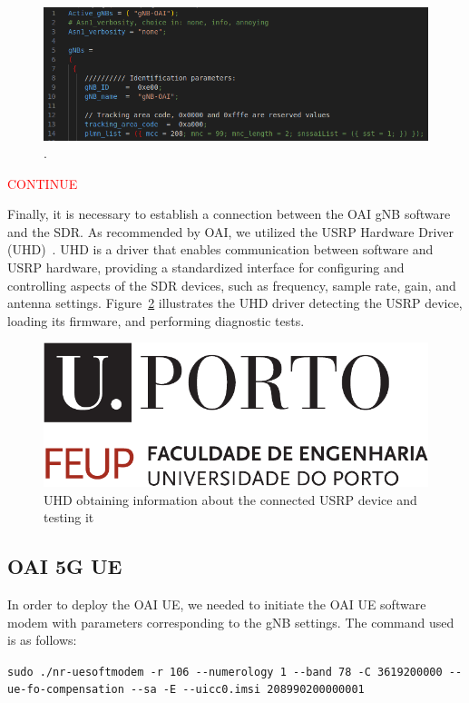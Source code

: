 \begin{figure}[H]
    \centering
    \includegraphics[width=0.7\linewidth]{figures/gnb_conf}
    \caption{.}
    \label{fig:gnb_conf}
\end{figure}

\textcolor{red}{CONTINUE}

Finally, it is necessary to establish a connection between the OAI gNB software and the SDR\@.
As recommended by OAI, we utilized the USRP Hardware Driver (UHD)~\cite{uhdusrpdriver}.
UHD is a driver that enables communication between software and USRP hardware, providing a standardized interface for configuring and controlling aspects of the SDR devices, such as frequency, sample rate, gain, and antenna settings.
Figure~\ref{fig:uhd_probe} illustrates the UHD driver detecting the USRP device, loading its firmware, and performing diagnostic tests.

\begin{figure}[H]
    \centering
    \includegraphics[width=0.7\linewidth]{figures/uporto-feup}
    \caption{UHD obtaining information about the connected USRP device and testing it}
    \label{fig:uhd_probe}
\end{figure}

\subsection{OAI 5G UE}\label{subsec:oai-5g-ue}
In order to deploy the OAI UE, we needed to initiate the OAI UE software modem with parameters corresponding to the gNB settings.
The command used is as follows:

\lstinline[columns=flexible,breaklines=true]{sudo ./nr-uesoftmodem -r 106 --numerology 1 --band 78 -C 3619200000 --ue-fo-compensation --sa -E --uicc0.imsi 208990200000001}


